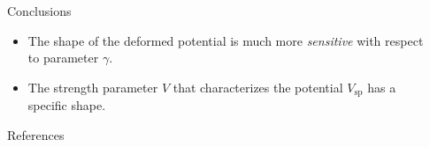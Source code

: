 \documentclass[final]{beamer}
\newlength{\sepwidth}
\newlength{\colwidth}
\newcommand{\separatorcolumn}{\begin{column}{\sepwidth}\end{column}}
\begin{document}
\begin{frame}[t]
\begin{columns}[t]
\begin{column}{\colwidth}
    \begin{block}{Conclusions}
    \begin{itemize}
    \item The shape of the deformed potential is much more \emph{sensitive} with respect to  parameter $\gamma$.
    \item The strength parameter $V$ that characterizes the potential $V_\text{sp}$ has a specific shape.
    \end{itemize}
  \end{block}

  \begin{block}{References}

    \nocite{*}
    \tiny{}

  \end{block}

\end{column}

\separatorcolumn

\end{columns}

\end{frame}
\end{document}
